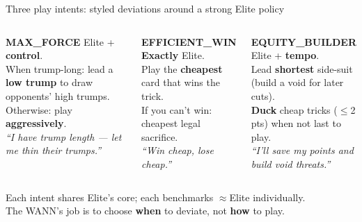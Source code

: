 \documentclass[10pt]{beamer}
\begin{document}
\begin{frame}{Three play intents: styled deviations around a strong Elite policy}
  \begin{columns}[T]
      \centering
      \begin{block}{\centering\textbf{MAX\_FORCE}}
        \vspace{1em}
        \footnotesize
        Elite + \textbf{control}.\\[4pt]
        When trump-long: lead a \textbf{low trump} to draw opponents' high trumps.\\[4pt]
        Otherwise: play \textbf{aggressively}.\\[4pt]
        \textit{``I have trump length --- let me thin their trumps.''}
      \end{block}
      \centering
      \begin{block}{\centering\textbf{EFFICIENT\_WIN}}
        \vspace{1em}
        \footnotesize
        \textbf{Exactly} Elite.\\[4pt]
        Play the \textbf{cheapest} card that wins the trick.\\[4pt]
        If you can't win: cheapest legal sacrifice.\\[4pt]
        \textit{``Win cheap, lose cheap.''}
      \end{block}
      \centering
      \begin{block}{\centering\textbf{EQUITY\_BUILDER}}
        \vspace{1em}
        \footnotesize
        Elite + \textbf{tempo}.\\[4pt]
        Lead \textbf{shortest} side-suit (build a void for later cuts).\\[4pt]
        \textbf{Duck} cheap tricks ($\leq$2 pts) when not last to play.\\[4pt]
        \textit{``I'll save my points and build void threats.''}
      \end{block}
  \end{columns}
  \vspace{8pt}
  \centering
  \footnotesize
  Each intent shares Elite's core; each benchmarks $\approx$Elite individually.\\
  The WANN's job is to choose \textbf{when} to deviate, not \textbf{how} to play.
\end{frame}
\end{document}
